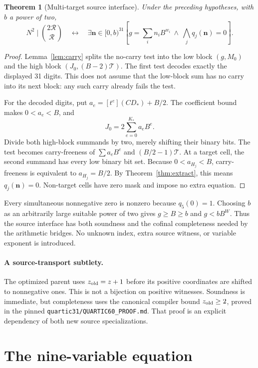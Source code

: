 \documentclass[11pt]{article}
\newtheorem{theorem}{Theorem}[section]
\begin{document}
\begin{theorem}[Multi-target source interface]\label{thm:sourcecarry}
Under the preceding hypotheses, with $b$ a power of two,
\[
 N^2\mid\binom{2\mathcal R}{\mathcal R}
 \quad\longleftrightarrow\quad
 \exists\mathbf n\in[0,b)^{31}\left[
 g=\sum_i n_iB^{w_i}\ \land\ \bigwedge_jq_j(\mathbf n)=0\right].
\]
\end{theorem}
\begin{proof}
Lemma~\ref{lem:carry} splits the no-carry test into the low block
$(g,M_0)$ and the high block $(J_0,(B-2)\mathcal T)$. The first test decodes
exactly the displayed 31 digits. This does not assume that the low-block sum
has no carry into its next block: any such carry already fails the test.

For the decoded digits, put $a_e=[t^e](CD_*)+B/2$. The coefficient bound
makes $0<a_e<B$, and
\[
 J_0=2\sum_{e=0}^{K_*}a_eB^e.
\]
Divide both high-block summands by two, merely shifting their binary bits.
The test becomes carry-freeness of $\sum a_eB^e$ and
$(B/2-1)\mathcal T$. At a target cell, the second summand has every low
binary bit set. Because $0<a_{H_j}<B$, carry-freeness is equivalent to
$a_{H_j}=B/2$. By Theorem~\ref{thm:extract}, this means $q_j(\mathbf n)=0$.
Non-target cells have zero mask and impose no extra equation.
\end{proof}

Every simultaneous nonnegative zero is nonzero because $q_5(0)=1$.
Choosing $b$ as an arbitrarily large suitable power of two gives
$g\ge B\ge b$ and $g<bB^W$. Thus the source interface has both soundness
and the cofinal completeness needed by the arithmetic bridges. No unknown
index, extra source witness, or variable exponent is introduced.

\paragraph{A source-transport subtlety.} The optimized parent uses $z_{\rm old}=z+1$ before its positive coordinates are shifted to nonnegative ones. This is not a bijection on positive witnesses. Soundness is immediate, but completeness uses the canonical compiler bound $z_{\rm old}\ge2$, proved in the pinned \texttt{quartic31/QUARTIC60\_PROOF.md}. That proof is an explicit dependency of both new source specializations.

\section{The nine-variable equation}
\end{document}
